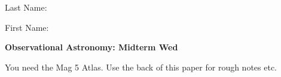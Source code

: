 \documentclass[11pt]{article}
\begin{document}
\def\arcsec{\ifmmode {^{\scriptscriptstyle\prime\prime}}
          \else $^{\scriptscriptstyle\prime\prime}$\fi}
\def\arcmin{\ifmmode {^{\scriptscriptstyle\prime}}
          \else $^{\scriptscriptstyle\prime}$\fi}
\def\deg{\ifmmode^\circ\else$^\circ$\fi}



{    \hfill Last Name:\,\makebox[6cm]{\hrulefill}} 

{ \hfill First Name:\,\makebox[6cm]{\hrulefill}}

\vskip 0.8cm
\begin{center}
{\large \bf Observational Astronomy: Midterm Wed} \\
\end{center}

\noindent You need the Mag 5 Atlas.
Use the back of this paper for rough notes etc.

\bigskip
\end{document}
